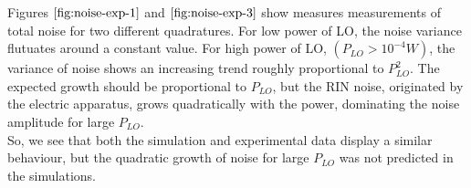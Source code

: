 %
Figures $\ref{fig:noise-exp-1}$ and $\ref{fig:noise-exp-3}$ show measures measurements of total noise for two different quadratures. For low power of LO, the noise variance flutuates around a constant value. For high power of LO, $(P_{LO}>10^{-4}W)$, the variance of noise shows an increasing trend roughly proportional to $P_{LO}^2$. The expected growth should be proportional to $P_{LO}$, but the RIN noise, originated by the electric apparatus, grows quadratically with the power, dominating the noise amplitude for large $P_{LO}$.\\
So, we see that both the simulation and experimental data display a similar behaviour, but the quadratic growth of noise for large $P_{LO}$ was not predicted in the simulations.\\
%
%




